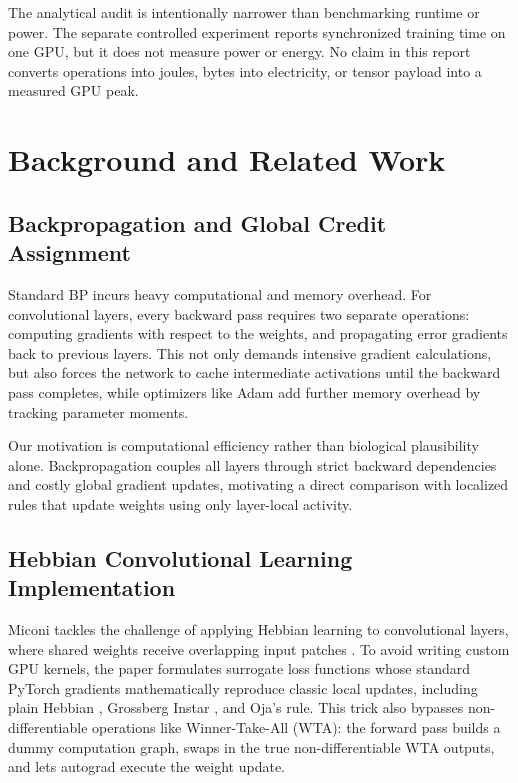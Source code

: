 \documentclass{article}
\begin{document}
    {\color{red}The analytical audit is intentionally narrower than benchmarking runtime or power. The separate controlled experiment reports synchronized training time on one GPU, but it does not measure power or energy. No claim in this report converts operations into joules, bytes into electricity, or tensor payload into a measured GPU peak.}
    
    \section{Background and Related Work}
    
    \subsection{Backpropagation and Global Credit Assignment}
    
    Standard BP incurs heavy computational and memory overhead. For convolutional layers, every backward pass requires two separate operations: computing gradients with respect to the weights, and propagating error gradients back to previous layers. This not only demands intensive gradient calculations, but also forces the network to cache intermediate activations until the backward pass completes, while optimizers like Adam add further memory overhead by tracking parameter moments.

    Our motivation is computational efficiency rather than biological plausibility alone. Backpropagation couples all layers through strict backward dependencies and costly global gradient updates, motivating a direct comparison with localized rules that update weights using only layer-local activity.
    
    \subsection{Hebbian Convolutional Learning Implementation}
    
    Miconi tackles the challenge of applying Hebbian learning to convolutional layers, where shared weights receive overlapping input patches \citep{miconi2021hebbian}. To avoid writing custom GPU kernels, the paper formulates surrogate loss functions whose standard PyTorch gradients mathematically reproduce classic local updates, including plain Hebbian \cite{hebb1949organization}, Grossberg Instar \cite{grossberg1976adaptive}, and Oja's rule. This trick also bypasses non-differentiable operations like Winner-Take-All (WTA): the forward pass builds a dummy computation graph, swaps in the true non-differentiable WTA outputs, and lets autograd execute the weight update.
    
\end{document}
